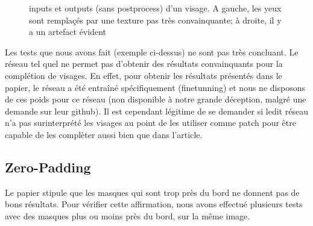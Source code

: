\documentclass[12pt]{article}
\begin{document}
\begin{figure}[htb]
  \hfill
  \hfill
  \caption{inputs et outputs (sans postprocess) d'un visage. A gauche, les yeux sont remplaçés par une texture pas très convainquante; à droite, il y a un artefact évident}\label{fig:occlus_dynamic}
\end{figure}

Les tests que nous avons fait (exemple ci-dessus) ne sont pas très
concluant. Le réseau tel quel ne permet pas d'obtenir des résultats
convainquants pour la complétion de visages. En effet, pour obtenir
les résultats présentés dans le papier, le réseau a été entraîné
spécifiquement (finetunning) et nous ne disposons de ces poids pour ce
réseau (non disponible à notre grande déception, malgré une demande sur leur github). Il est cependant légitime de se demander si ledit réseau n'a pas surinterprété les visages au point de les utiliser comme patch pour être capable de les complèter aussi bien que dans l'article.

\subsection{Zero-Padding}

Le papier stipule que les masques qui sont trop près du bord ne donnent pas de bons résultats. Pour vérifier cette affirmation, nous avons effectué plusieurs tests avec des masques plus ou moins près du bord, sur la même image.
\end{document}
